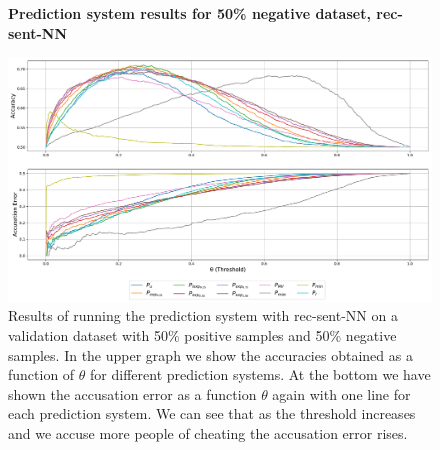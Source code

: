 \begin{figure}
    \centering
    \textbf{Prediction system results for 50\% negative dataset, \gls{rec-sent-NN}}\par\medskip
    \includegraphics[scale=0.33]{./pictures/experiments/rec_sent_nn/prediction_system_50}
    \caption{Results of running the prediction system with \gls{rec-sent-NN} on
        a validation dataset with 50\% positive samples and 50\% negative
        samples. In the upper graph we show the accuracies obtained as a
        function of $\theta$ for different prediction systems. At the bottom we
        have shown the accusation error as a function $\theta$ again with one
        line for each prediction system. We can see that as the threshold
        increases and we accuse more people of cheating the accusation error
        rises.}
    \label{fig:rec-sent-NN-pred-50}
\end{figure}

